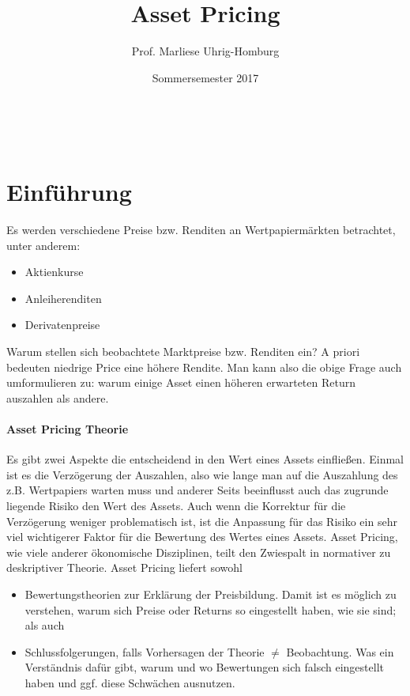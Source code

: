 \documentclass[12pt]{extreport} %
\title{Asset Pricing}
\author{Prof. Marliese Uhrig-Homburg}
\date{Sommersemester 2017}
\makeatletter
\theoremstyle{named}
\theoremstyle{nnamed}
\theoremstyle{itshape}
\theoremstyle{normal}
\def\maketitle{ \begin{titlepage} 
			~\vspace{3cm} 
		\begin{center} {\Huge \@title} \end{center} 
	 		\vspace*{1cm} 
	 	\begin{center} {\large \@author} \end{center} 
	 	\vspace*{-0.5cm}
	 	\begin{center} \@date \end{center} 
	 		\vspace*{7cm} 
	 	\begin{center} \@publishers \end{center} 
	 		\vfill 
	\end{titlepage} }
\makeatother
\begin{document}
\begin{titlepage}
	\maketitle
	\thispagestyle{empty}
\end{titlepage}

\tableofcontents
\thispagestyle{empty}


\chapter{Einführung}

Es werden verschiedene Preise bzw. Renditen an Wertpapiermärkten betrachtet, unter anderem:

\begin{itemize}
	\item Aktienkurse
	\item Anleiherenditen
	\item Derivatenpreise
\end{itemize}

Warum stellen sich beobachtete Marktpreise bzw. Renditen ein? A priori bedeuten niedrige Price eine höhere Rendite. Man kann also die obige Frage auch umformulieren zu: warum einige Asset einen höheren erwarteten Return auszahlen als andere.

\subsubsection{Asset Pricing Theorie}
Es gibt zwei Aspekte die entscheidend in den Wert eines Assets einfließen. Einmal ist es die Verzögerung der Auszahlen, also wie lange man auf die Auszahlung des z.B. Wertpapiers warten muss und anderer Seits beeinflusst auch das zugrunde liegende Risiko den Wert des Assets. Auch wenn die Korrektur für die Verzögerung weniger problematisch ist, ist die Anpassung für das Risiko ein sehr viel wichtigerer Faktor für die Bewertung des Wertes eines Assets. Asset Pricing, wie viele anderer ökonomische Disziplinen, teilt den Zwiespalt in normativer zu deskriptiver Theorie. Asset Pricing liefert sowohl
\begin{itemize}
	\item Bewertungstheorien zur Erklärung der Preisbildung. Damit ist es möglich zu verstehen, warum sich Preise oder Returns so eingestellt haben, wie sie sind; als auch
	\item Schlussfolgerungen, falls Vorhersagen der Theorie $\neq$ Beobachtung. Was ein Verständnis dafür gibt, warum und wo Bewertungen sich falsch eingestellt haben und ggf. diese Schwächen ausnutzen.
\end{itemize}
\end{document}
